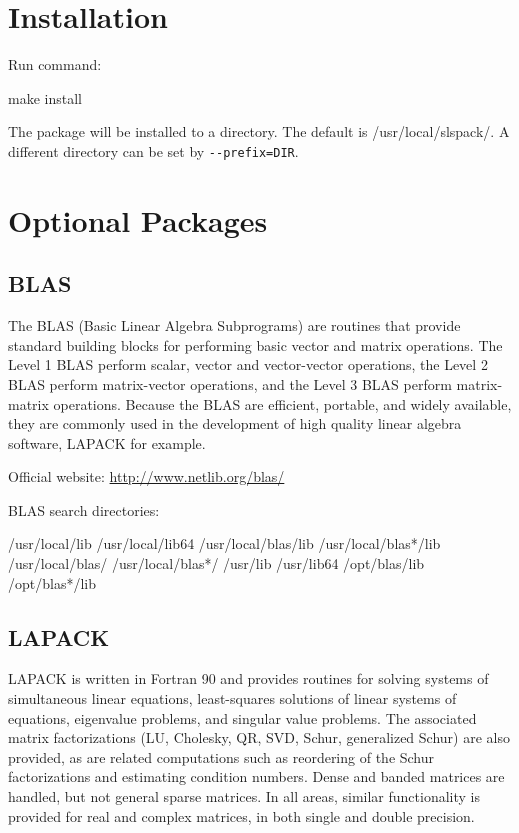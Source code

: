 \section{Installation}
Run command:
\begin{evb}
make install
\end{evb}
The package will be installed to a directory. The default is /usr/local/slspack/. 
A different directory can be set by \verb|--prefix=DIR|.

\section{Optional Packages}

\subsection{BLAS}
The BLAS (Basic Linear Algebra Subprograms) are routines that provide standard building blocks for performing basic vector and matrix operations. The Level 1 BLAS perform scalar, vector and vector-vector operations, the Level 2 BLAS perform matrix-vector operations, and the Level 3 BLAS perform matrix-matrix operations. Because the BLAS are efficient, portable, and widely available, they are commonly used in the development of high quality linear algebra software, LAPACK for example.

Official website: \url{http://www.netlib.org/blas/}

BLAS search directories:
\begin{evb}
/usr/local/lib
/usr/local/lib64
/usr/local/blas/lib
/usr/local/blas*/lib
/usr/local/blas/
/usr/local/blas*/
/usr/lib
/usr/lib64
/opt/blas/lib
/opt/blas*/lib
\end{evb}

\subsection{LAPACK}
LAPACK is written in Fortran 90 and provides routines for solving systems of simultaneous linear equations, least-squares solutions of linear systems of equations, eigenvalue problems, and singular value problems. The associated matrix factorizations (LU, Cholesky, QR, SVD, Schur, generalized Schur) are also provided, as are related computations such as reordering of the Schur factorizations and estimating condition numbers. Dense and banded matrices are handled, but not general sparse matrices. In all areas, similar functionality is provided for real and complex matrices, in both single and double precision.

